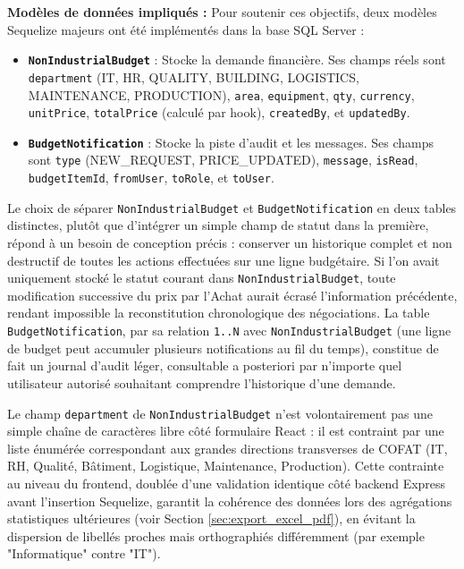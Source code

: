 \textbf{Modèles de données impliqués :}
Pour soutenir ces objectifs, deux modèles Sequelize majeurs ont été implémentés dans la base SQL Server :
\begin{itemize}
    \item \textbf{\texttt{NonIndustrialBudget}} : Stocke la demande financière. Ses champs réels sont \texttt{department} (IT, HR, QUALITY, BUILDING, LOGISTICS, MAINTENANCE, PRODUCTION), \texttt{area}, \texttt{equipment}, \texttt{qty}, \texttt{currency}, \texttt{unitPrice}, \texttt{totalPrice} (calculé par hook), \texttt{createdBy}, et \texttt{updatedBy}.
    \item \textbf{\texttt{BudgetNotification}} : Stocke la piste d'audit et les messages. Ses champs sont \texttt{type} (NEW\_REQUEST, PRICE\_UPDATED), \texttt{message}, \texttt{isRead}, \texttt{budgetItemId}, \texttt{fromUser}, \texttt{toRole}, et \texttt{toUser}.
\end{itemize}

Le choix de séparer \texttt{NonIndustrialBudget} et \texttt{BudgetNotification} en deux tables distinctes, plutôt que d'intégrer un simple champ de statut dans la première, répond à un besoin de conception précis : conserver un historique complet et non destructif de toutes les actions effectuées sur une ligne budgétaire. Si l'on avait uniquement stocké le statut courant dans \texttt{NonIndustrialBudget}, toute modification successive du prix par l'Achat aurait écrasé l'information précédente, rendant impossible la reconstitution chronologique des négociations. La table \texttt{BudgetNotification}, par sa relation \texttt{1..N} avec \texttt{NonIndustrialBudget} (une ligne de budget peut accumuler plusieurs notifications au fil du temps), constitue de fait un journal d'audit léger, consultable a posteriori par n'importe quel utilisateur autorisé souhaitant comprendre l'historique d'une demande.

Le champ \texttt{department} de \texttt{NonIndustrialBudget} n'est volontairement pas une simple chaîne de caractères libre côté formulaire React : il est contraint par une liste énumérée correspondant aux grandes directions transverses de COFAT (IT, RH, Qualité, Bâtiment, Logistique, Maintenance, Production). Cette contrainte au niveau du frontend, doublée d'une validation identique côté backend Express avant l'insertion Sequelize, garantit la cohérence des données lors des agrégations statistiques ultérieures (voir Section \ref{sec:export_excel_pdf}), en évitant la dispersion de libellés proches mais orthographiés différemment (par exemple "Informatique" contre "IT").

